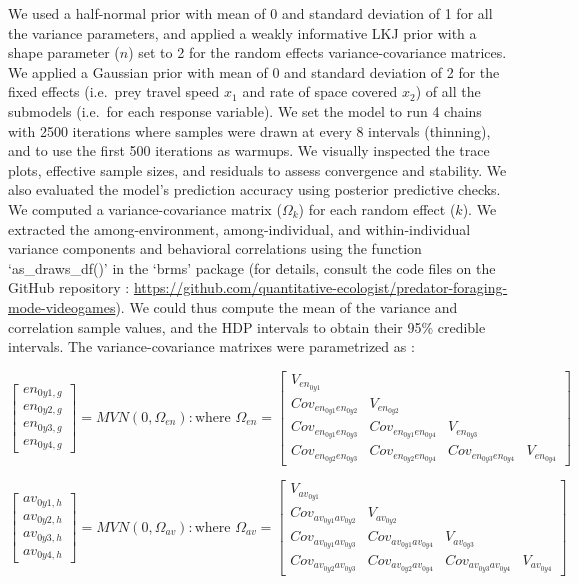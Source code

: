 \documentclass[
  11pt,
]{article}
\begin{document}
We used a half-normal prior with mean of 0 and standard deviation of 1
for all the variance parameters, and applied a weakly informative LKJ
prior with a shape parameter (\(n\)) set to 2 for the random effects
variance-covariance matrices. We applied a Gaussian prior with mean of 0
and standard deviation of 2 for the fixed effects (i.e.~prey travel
speed \(x_1\) and rate of space covered \(x_2\)) of all the submodels
(i.e.~for each response variable). We set the model to run 4 chains with
2500 iterations where samples were drawn at every 8 intervals
(thinning), and to use the first 500 iterations as warmups. We visually
inspected the trace plots, effective sample sizes, and residuals to
assess convergence and stability. We also evaluated the model's
prediction accuracy using posterior predictive checks. We computed a
variance-covariance matrix (\(\Omega_{k}\)) for each random effect
(\(k\)). We extracted the among-environment, among-individual, and
within-individual variance components and behavioral correlations using
the function `as\_draws\_df()' in the `brms' package (for details,
consult the code files on the GitHub repository :
\url{https://github.com/quantitative-ecologist/predator-foraging-mode-videogames}).
We could thus compute the mean of the variance and correlation sample
values, and the HDP intervals to obtain their 95\% credible intervals.
The variance-covariance matrixes were parametrized as :

\[
\begin{bmatrix}
en_{0y1,g} \\ 
en_{0y2,g} \\ 
en_{0y3,g} \\
en_{0y4,g}
\end{bmatrix}
= MVN(0, \Omega_{en}) : \text{where } \Omega_{en} = 
\begin{bmatrix}
V_{en_{0y1}} & & & \\
Cov_{en_{0y1}en_{0y2}} & V_{en_{0y2}} & & \\ 
Cov_{en_{0y1}en_{0y3}} & Cov_{en_{0y1}en_{0y4}} & V_{en_{0y3}} & \\
Cov_{en_{0y2}en_{0y3}} & Cov_{en_{0y2}en_{0y4}} & Cov_{en_{0y3}en_{0y4}} & V_{en_{0y4}}
\end{bmatrix}
\tag{S1}
\]

\[
\begin{bmatrix}
av_{0y1,h} \\ 
av_{0y2,h} \\ 
av_{0y3,h} \\
av_{0y4,h}
\end{bmatrix}
= MVN(0, \Omega_{av}) : \text{where } \Omega_{av} = 
\begin{bmatrix}
V_{av_{0y1}} & & & \\
Cov_{av_{0y1}av_{0y2}} & V_{av_{0y2}} & &\\ 
Cov_{av_{0y1}av_{0y3}} & Cov_{av_{0y1}av_{0y4}} & V_{av_{0y3}} & \\
Cov_{av_{0y2}av_{0y3}} & Cov_{av_{0y2}av_{0y4}} & Cov_{av_{0y3}av_{0y4}} & V_{av_{0y4}}
\end{bmatrix}
\tag{S2}
\]
\end{document}

